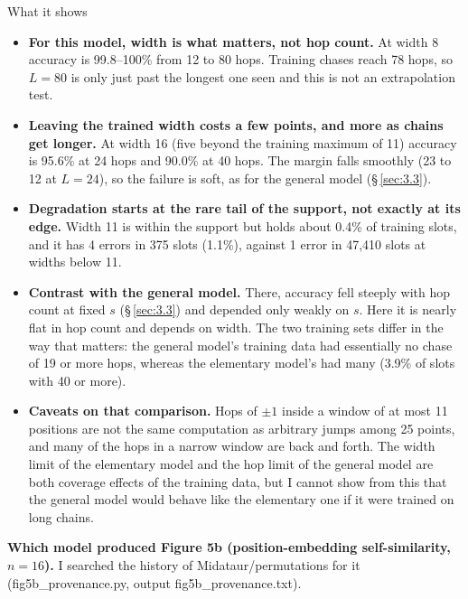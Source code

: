 \documentclass[paper=a4,fontsize=11pt,DIV=11,parskip=half,headings=small,numbers=noendperiod]{scrartcl}
\DeclareRobustCommand{\lead}[1]{\textsf{\bfseries\color{accent}#1}}
\DeclareRobustCommand{\code}[1]{{\fontseries{m}\ttfamily #1}}
\begin{document}
\begin{findbox}{What it shows}
\begin{itemize}
\item \lead{For this model, width is what matters, not hop count.} At width 8 accuracy is 99.8–100\% from 12 to
  80 hops. Training chases reach 78 hops, so $L=80$ is only just past the longest one seen and this is not an
  extrapolation test.
\item \lead{Leaving the trained width costs a few points, and more as chains get longer.} At width 16 (five
  beyond the training maximum of 11) accuracy is 95.6\% at 24 hops and 90.0\% at 40 hops. The margin falls
  smoothly (23 to 12 at $L=24$), so the failure is soft, as for the general model (\S\,\ref{sec:3.3}).
\item \lead{Degradation starts at the rare tail of the support, not exactly at its edge.} Width 11 is within the
  support but holds about 0.4\% of training slots, and it has 4 errors in 375 slots (1.1\%), against 1 error in
  47,410 slots at widths below 11.
\item \lead{Contrast with the general model.} There, accuracy fell steeply with hop count at fixed $s$
  (\S\,\ref{sec:3.3}) and depended only weakly on $s$. Here it is nearly flat in hop count and depends on width.
  The two training sets differ in the way that matters: the general model’s training data had essentially no
  chase of 19 or more hops, whereas the elementary model’s had many (3.9\% of slots with 40 or more).
\item \lead{Caveats on that comparison.} Hops of $\pm1$ inside a window of at most 11 positions are not the same
  computation as arbitrary jumps among 25 points, and many of the hops in a narrow window are back and forth.
  The width limit of the elementary model and the hop limit of the general model are both coverage effects of
  the training data, but I cannot show from this that the general model would behave like the elementary one if
  it were trained on long chains.
\end{itemize}
\end{findbox}

\lead{Which model produced Figure 5b (position-embedding self-similarity, $n=16$).} I searched the history of
\code{Midataur/\allowbreak{}permutations} for it (\code{fig5b\_\allowbreak{}provenance.\allowbreak{}py}, output
\code{fig5b\_\allowbreak{}provenance.\allowbreak{}txt}).
\end{document}
